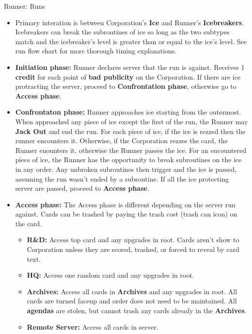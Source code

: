 \documentclass[12pt]{article}
\newenvironment{itemizeCustom}
{\begin{itemize}
  \setlength{\itemsep}{1pt}
  \setlength{\parskip}{0pt}
  \setlength{\parsep}{0pt}}
{\end{itemize}}
\begin{document}
\begin{multicols*}{2}
Runner: Runs
\begin{itemizeCustom}
	\item Primary interation is between Corporation's \textbf{Ice} and Runner's \textbf{Icebreakers}. Icebreakers can break the subroutines of ice so long as the two subtypes match and the icebreaker's level is greater than or equal to the ice's level. See run flow chart for more thorough timing explanations.
	\item \textbf{Initiation phase:} Runner declares server that the run is against. Receives 1 \textbf{credit} for each point of \textbf{bad publicity} on the Corporation. If there are ice protracting the server, proceed to \textbf{Confrontation phase}, otherwise go to \textbf{Access phase}.
	\item \textbf{Confrontaton phase:} Runner approaches ice starting from the outermost. When approached any piece of ice except the first of the run, the Runner may \textbf{Jack Out} and end the run. For each piece of ice, if the ice is rezzed then the runner encounters it. Otherwise, if the Corporation rezzes the card, the Runner enounters it, otherwise the Runner passes the ice. For an encountered piece of ice, the Runner has the opportunity to break subroutines on the ice in any order. Any unbroken subroutines then trigger and the ice is passed, assuming the run wasn't ended by a subroutine. If all the ice protecting server are passed, proceed to \textbf{Access phase}.
	\item \textbf{Access phase:} The Access phase is different depending on the server run against. Cards can be trashed by paying the trash cost (trash can icon) on the card.
	\begin{itemizeCustom}
		\item \textbf{R\&D:} Access top card and any upgrades in root. Cards aren't show to Corporation unless they are scored, trashed, or forced to reveal by card text.
		\item \textbf{HQ:} Access one random card and any upgrades in root. 
		\item \textbf{Archives:} Access all cards in \textbf{Archives} and any upgrades in root. All cards are turned faceup and order does not need to be maintained. All \textbf{agendas} are stolen, but cannot trash any cards already in the \textbf{Archives}.
		\item \textbf{Remote Server:} Access all cards in server.
	\end{itemizeCustom}
\end{itemizeCustom}
\end{multicols*}
\end{document}
